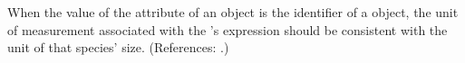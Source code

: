 When the value of the attribute  of an \EventAssignment
object is the identifier of a \Species object, the unit of measurement
associated with the \EventAssignment's  expression should be
consistent with the unit of that species' size.  (References: .)
